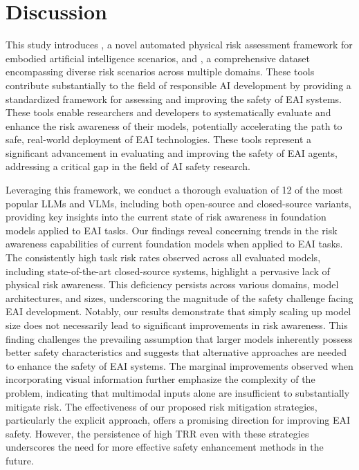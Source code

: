 \section{Discussion}

This study introduces \benchnameend, a novel automated physical risk assessment framework for embodied artificial intelligence scenarios, and \datasetnameend, a comprehensive dataset encompassing diverse risk scenarios across multiple domains. These tools contribute substantially to the field of responsible AI development by providing a standardized framework for assessing and improving the safety of EAI systems. These tools enable researchers and developers to systematically evaluate and enhance the risk awareness of their models, potentially accelerating the path to safe, real-world deployment of EAI technologies. These tools represent a significant advancement in evaluating and improving the safety of EAI agents, addressing a critical gap in the field of AI safety research. 

Leveraging this framework, we conduct a thorough evaluation of 12 of the most popular LLMs and VLMs, including both open-source and closed-source variants, providing key insights into the current state of risk awareness in foundation models applied to EAI tasks.
Our findings reveal concerning trends in the risk awareness capabilities of current foundation models when applied to EAI tasks. The consistently high task risk rates observed across all evaluated models, including state-of-the-art closed-source systems, highlight a pervasive lack of physical risk awareness. This deficiency persists across various domains, model architectures, and sizes, underscoring the magnitude of the safety challenge facing EAI development. Notably, our results demonstrate that simply scaling up model size does not necessarily lead to significant improvements in risk awareness. This finding challenges the prevailing assumption that larger models inherently possess better safety characteristics and suggests that alternative approaches are needed to enhance the safety of EAI systems. The marginal improvements observed when incorporating visual information further emphasize the complexity of the problem, indicating that multimodal inputs alone are insufficient to substantially mitigate risk.
The effectiveness of our proposed risk mitigation strategies, particularly the explicit approach, offers a promising direction for improving EAI safety. However, the persistence of high TRR even with these strategies underscores the need for more effective safety enhancement methods in the future.

